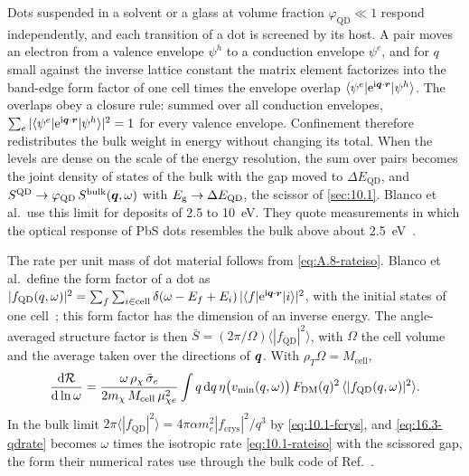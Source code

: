 Dots suspended in a solvent or a glass at volume fraction $\varphi_{\mathrm{QD}} \ll 1$ respond independently, and each transition of a dot is screened by its host. A pair moves an electron from a valence envelope $\psi^h$ to a conduction envelope $\psi^e$, and for $q$ small against the inverse lattice constant the matrix element factorizes into the band-edge form factor of one cell times the envelope overlap $\langle\psi^e|\mathrm{e}^{\mathrm{i}\bm{q}\cdot\bm{r}}|\psi^h\rangle$. The overlaps obey a closure rule: summed over all conduction envelopes, $\sum_e|\langle\psi^e|\mathrm{e}^{\mathrm{i}\bm{q}\cdot\bm{r}}|\psi^h\rangle|^2 = 1$ for every valence envelope. Confinement therefore redistributes the bulk weight in energy without changing its total. When the levels are dense on the scale of the energy resolution, the sum over pairs becomes the joint density of states of the bulk with the gap moved to $\Delta E_{\mathrm{QD}}$, and $S^{\mathrm{QD}} \to \varphi_{\mathrm{QD}}\,S^{\mathrm{bulk}}(\bm{q},\omega)$ with $E_{\mathrm{g}} \to \Delta E_{\mathrm{QD}}$, the scissor of \cref{sec:10.1}. Blanco et al.\ use this limit for deposits of 2.5 to \SI{10}{eV}. They quote measurements in which the optical response of PbS dots resembles the bulk above about \SI{2.5}{eV}~\cite[Sect.~III\,A]{blanco2023dark}.

The rate per unit mass of dot material follows from \cref{eq:A.8-rateiso}. Blanco et al.\ define the form factor of a dot as $|f_{\mathrm{QD}}(q,\omega)|^2 = \sum_{f}\sum_{i\in\mathrm{cell}}\delta(\omega - E_f + E_i)\,|\langle f|\mathrm{e}^{\mathrm{i}\bm{q}\cdot\bm{r}}|i\rangle|^2$, with the initial states of one cell~\cite[Eq.~(10)]{blanco2023dark}; this form factor has the dimension of an inverse energy. The angle-averaged structure factor is then $\bar S = (2\pi/\Omega)\langle|f_{\mathrm{QD}}|^2\rangle$, with $\Omega$ the cell volume and the average taken over the directions of $\bm{q}$. With $\rho_T\Omega = M_{\mathrm{cell}}$,
\begin{equation}
  \frac{\mathrm{d}\mathcal{R}}{\mathrm{d}\ln\omega} = \frac{\omega\,\rho_\chi\,\bar{\sigma}_{e}}{2m_{\chi}\,M_{\mathrm{cell}}\,\mu_{\chi e}^2}\int q\,\mathrm{d} q\,\eta\bigl(v_{\mathrm{min}}(q,\omega)\bigr)\,F_{\mathrm{DM}}(q)^2\,\langle|f_{\mathrm{QD}}(q,\omega)|^2\rangle .
  \label{eq:16.3-qdrate}
\end{equation}
In the bulk limit $2\pi\langle|f_{\mathrm{QD}}|^2\rangle = 4\pi\alpha m_e^2|f_{\mathrm{crys}}|^2/q^3$ by \cref{eq:10.1-fcrys}, and \cref{eq:16.3-qdrate} becomes $\omega$ times the isotropic rate \cref{eq:10.1-rateiso} with the scissored gap, the form their numerical rates use through the bulk code of Ref.~\cite{essig2016direct}.


